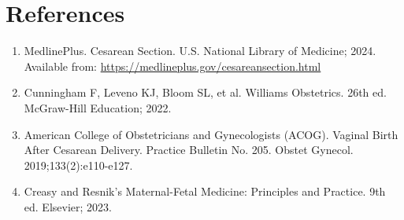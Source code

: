 \section*{References}
\begin{enumerate}
  \item MedlinePlus. Cesarean Section. U.S. National Library of Medicine; 2024. Available from: \url{https://medlineplus.gov/cesareansection.html}
  \item Cunningham F, Leveno KJ, Bloom SL, et al. Williams Obstetrics. 26th ed. McGraw-Hill Education; 2022.
  \item American College of Obstetricians and Gynecologists (ACOG). Vaginal Birth After Cesarean Delivery. Practice Bulletin No. 205. Obstet Gynecol. 2019;133(2):e110-e127.
  \item Creasy and Resnik's Maternal-Fetal Medicine: Principles and Practice. 9th ed. Elsevier; 2023.
\end{enumerate}

\clearpage
